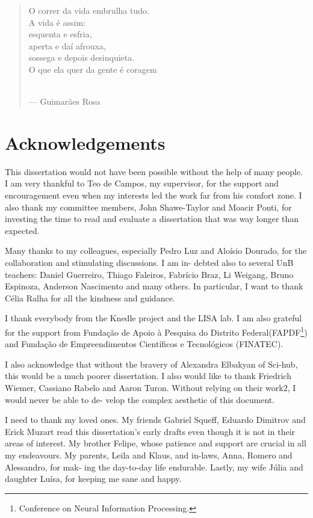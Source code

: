 \documentclass[
  letterpaper,
]{tufte-book}
\begin{document}
\begin{quote}
O correr da vida embrulha tudo.\\
A vida é assim:\\
esquenta e esfria,\\
aperta e daí afrouxa,\\
sossega e depois desinquieta.\\
O que ela quer da gente é coragem\\
\strut \\
--- Guimarães Rosa
\end{quote}


\hypertarget{acknowledgements}{%
\chapter{Acknowledgements}\label{acknowledgements}}

This dissertation would not have been possible without the help of many
people. I am very thankful to Teo de Campos, my supervisor, for the
support and encouragement even when my interests led the work far from
his comfort zone. I also thank my committee members, John Shawe-Taylor
and Moacir Ponti, for investing the time to read and evaluate a
dissertation that was way longer than expected.

Many thanks to my colleagues, especially Pedro Luz and Aloísio Dourado,
for the collaboration and stimulating discussions. I am in- debted also
to several UnB teachers: Daniel Guerreiro, Thiago Faleiros, Fabrício
Braz, Li Weigang, Bruno Espinoza, Anderson Nascimento and many others.
In particular, I want to thank Célia Ralha for all the kindness and
guidance.

I thank everybody from the Knedle project and the LISA lab. I am also
grateful for the support from Fundação de Apoio à Pesquisa do Distrito
Federal(FAPDF\footnote{Conference on Neural Information Processing.})
and Fundação de Empreendimentos Científicos e Tecnológicos (FINATEC).

I also acknowledge that without the bravery of Alexandra Elbakyan of
Sci-hub, this would be a much poorer dissertation. I also would like to
thank Friedrich Wiemer, Cassiano Rabelo and Aaron Turon. Without relying
on their work2, I would never be able to de- velop the complex aesthetic
of this document.

I need to thank my loved ones. My friends Gabriel Squeff, Eduardo
Dimitrov and Erick Muzart read this dissertation's early drafts even
though it is not in their areas of interest. My brother Felipe, whose
patience and support are crucial in all my endeavours. My parents, Leila
and Klaus, and in-laws, Anna, Romero and Alessandro, for mak- ing the
day-to-day life endurable. Lastly, my wife Júlia and daughter Luísa, for
keeping me sane and happy.
\end{document}
